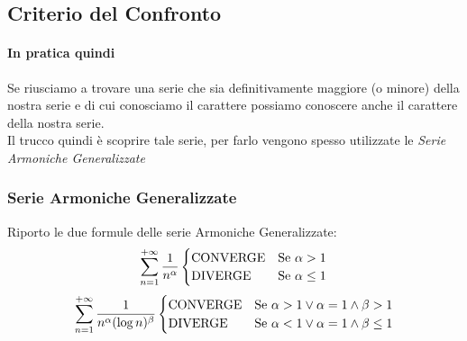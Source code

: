 \documentclass[12pt, a4paper, openany]{book}
\begin{document}
\subsection{Criterio del Confronto}

\paragraph*{In pratica quindi} Se riusciamo a trovare una serie che sia definitivamente maggiore (o minore) della nostra serie e di cui conosciamo il carattere
possiamo conoscere anche il carattere della nostra serie.
\\Il trucco quindi è scoprire tale serie, per farlo vengono spesso utilizzate le \emph{Serie Armoniche Generalizzate}

\subsubsection{Serie Armoniche Generalizzate}
Riporto le due formule delle serie Armoniche Generalizzate:
\begin{equation*}
	\sum_{n=1}^{+\infty} \frac{1}{n^\alpha} \begin{cases}
		\text{CONVERGE} & \text{Se } \alpha > 1    \\
		\text{DIVERGE}  & \text{Se } \alpha \leq 1
	\end{cases}
\end{equation*}
\begin{equation*}
	\sum_{n=1}^{+\infty} \frac{1}{n^\alpha (\log n)^\beta} \begin{cases}
		\text{CONVERGE} & \text{Se } \alpha > 1 \vee \alpha = 1 \wedge \beta > 1    \\
		\text{DIVERGE}  & \text{Se } \alpha < 1 \vee \alpha = 1 \wedge \beta \leq 1
	\end{cases}
\end{equation*}

\end{document}
